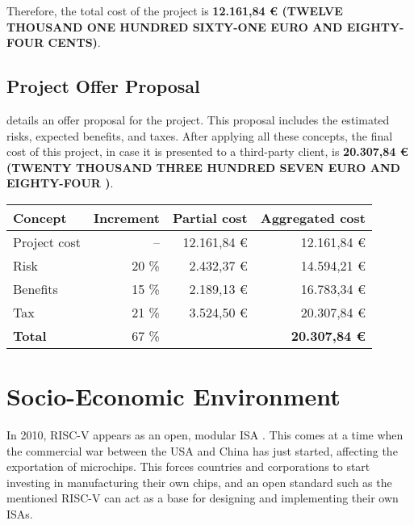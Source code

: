 Therefore, the total cost of the project is \textbf{12.161,84 € (TWELVE THOUSAND ONE HUNDRED SIXTY-ONE EURO AND EIGHTY-FOUR CENTS)}.


\subsection{Project Offer Proposal}\label{subsec:offer-proposal}
 details an offer proposal for the project. This proposal includes the estimated risks, expected benefits, and taxes. After applying all these concepts, the final cost of this project, in case it is presented to a third-party client, is \textbf{20.307,84 € (TWENTY THOUSAND THREE HUNDRED SEVEN EURO AND EIGHTY-FOUR )}.

\begin{table}[htb]
    {
      \begin{tabular}{lrrr}
        \toprule
        \textbf{Concept} & \textbf{Increment} & \textbf{Partial cost} & \textbf{Aggregated cost} \\
        \midrule
        Project cost   & --    & 12.161,84 € & 12.161,84 € \\
        Risk           & 20 \% &  2.432,37 € & 14.594,21 € \\
        Benefits       & 15 \% &  2.189,13 € & 16.783,34 € \\
        Tax            & 21 \% &  3.524,50 € & 20.307,84 € \\
        \midrule
        \textbf{Total} & 67 \% & & \textbf{20.307,84 €} \\
        \bottomrule
      \end{tabular}
    }
\end{table}



\section{Socio-Economic Environment}\label{sec:environment}

In 2010, RISC-V appears as an open, modular \gls{ISA} \parencite{riscvOrigin}. This comes at a time when the commercial war between the USA and China has just started, affecting the exportation of microchips. This forces countries and corporations to start investing in manufacturing their own chips, and an open standard such as the mentioned RISC-V can act as a base for designing and implementing their own \glspl{ISA}.

